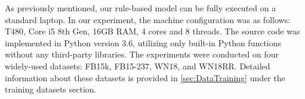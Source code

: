 As previously mentioned, our rule-based model can be fully executed on a standard laptop. In our experiment, the machine configuration was as follows: T480, Core i5 8th Gen, 16GB RAM, 4 cores and 8 threads. The source code was implemented in Python version 3.6, utilizing only built-in Python functions without any third-party libraries. The experiments were conducted on four widely-used datasets: FB15k, FB15-237, WN18, and WN18RR. Detailed information about these datasets is provided in \autoref{sec:DataTraining} under the training datasets section.



\begin{table}[h]
	\begin{center}
		\caption{Experimental results on the FB15k and FB15k-237 datasets}
		\label{tab:resultOnFreeBase}%
	\end{center}
\end{table}


